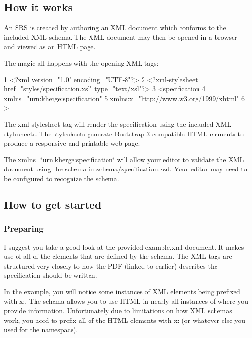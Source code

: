 \subsection*{How it works }

An S\+RS is created by authoring an X\+ML document which conforms to the included X\+ML schema. The X\+ML document may then be opened in a browser and viewed as an H\+T\+ML page.

The magic all happens with the opening X\+ML tags\+:


\begin{DoxyCode}
1 <?\textcolor{keyword}{xml} \textcolor{keyword}{version}=\textcolor{stringliteral}{"1.0"} \textcolor{keyword}{encoding}=\textcolor{stringliteral}{"UTF-8"}?>
2 <?\textcolor{keyword}{xml-stylesheet} \textcolor{keyword}{href}=\textcolor{stringliteral}{"styles/specification.xsl"} \textcolor{keyword}{type}=\textcolor{stringliteral}{"text/xsl"}?>
3 <\textcolor{keywordtype}{specification}
4   \textcolor{keyword}{xmlns}=\textcolor{stringliteral}{"urn:kherge:specification"}
5   \textcolor{keyword}{xmlns:x}=\textcolor{stringliteral}{"http://www.w3.org/1999/xhtml"}
6 >
\end{DoxyCode}


The {\ttfamily xml-\/stylesheet} tag will render the specification using the included X\+ML stylesheets. The stylesheets generate Bootstrap 3 compatible H\+T\+ML elements to produce a responsive and printable web page.

The {\ttfamily xmlns=\char`\"{}urn\+:kherge\+:specification\char`\"{}} will allow your editor to validate the X\+ML document using the schema in {\ttfamily schema/specification.\+xsd}. Your editor may need to be configured to recognize the schema.

\subsection*{How to get started }

\subsubsection*{Preparing}

I suggest you take a good look at the provided {\ttfamily example.\+xml} document. It makes use of all of the elements that are defined by the schema. The X\+ML tags are structured very closely to how the P\+DF (linked to earlier) describes the specification should be written.

In the example, you will notice some instances of X\+ML elements being prefixed with {\ttfamily x\+:}. The schema allows you to use H\+T\+ML in nearly all instances of where you provide information. Unfortunately due to limitations on how X\+ML schemas work, you need to prefix all of the H\+T\+ML elements with {\ttfamily x\+:} (or whatever else you used for the namespace).

